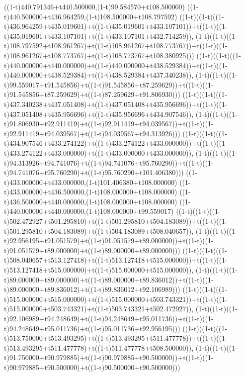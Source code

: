 ((1-t)440.791346+t440.500000,(1-t)99.584570+t108.500000)
((1-t)440.500000+t436.964259,(1-t)108.500000+t108.797592)
((1-t)((1-t)((1-t)436.964259+t435.019601)+t((1-t)435.019601+t433.107101))+t((1-t)((1-t)435.019601+t433.107101)+t((1-t)433.107101+t432.714259)),                                     (1-t)((1-t)((1-t)108.797592+t108.961267)+t((1-t)108.961267+t108.773767))+t((1-t)((1-t)108.961267+t108.773767)+t((1-t)108.773767+t108.380925)))
((1-t)((1-t)((1-t)440.000000+t440.000000)+t((1-t)440.000000+t438.529384))+t((1-t)((1-t)440.000000+t438.529384)+t((1-t)438.529384+t437.340238)),                                     (1-t)((1-t)((1-t)99.559017+t91.545856)+t((1-t)91.545856+t87.259629))+t((1-t)((1-t)91.545856+t87.259629)+t((1-t)87.259629+t91.806930)))
((1-t)((1-t)((1-t)437.340238+t437.051408)+t((1-t)437.051408+t435.956696))+t((1-t)((1-t)437.051408+t435.956696)+t((1-t)435.956696+t434.907546)),                                     (1-t)((1-t)((1-t)91.806930+t92.911419)+t((1-t)92.911419+t94.039567))+t((1-t)((1-t)92.911419+t94.039567)+t((1-t)94.039567+t94.313926)))
((1-t)((1-t)((1-t)434.907546+t433.274122)+t((1-t)433.274122+t433.000000))+t((1-t)((1-t)433.274122+t433.000000)+t((1-t)433.000000+t433.000000)),                                     (1-t)((1-t)((1-t)94.313926+t94.741076)+t((1-t)94.741076+t95.760290))+t((1-t)((1-t)94.741076+t95.760290)+t((1-t)95.760290+t101.406380)))
((1-t)433.000000+t433.000000,(1-t)101.406380+t108.000000)
((1-t)433.000000+t436.500000,(1-t)108.000000+t108.000000)
((1-t)436.500000+t440.000000,(1-t)108.000000+t108.000000)
((1-t)440.000000+t440.000000,(1-t)108.000000+t99.559017)
((1-t)((1-t)((1-t)502.472927+t501.295810)+t((1-t)501.295810+t504.183089))+t((1-t)((1-t)501.295810+t504.183089)+t((1-t)504.183089+t508.040657)),                                     (1-t)((1-t)((1-t)92.956195+t91.051579)+t((1-t)91.051579+t89.000000))+t((1-t)((1-t)91.051579+t89.000000)+t((1-t)89.000000+t89.000000)))
((1-t)((1-t)((1-t)508.040657+t513.127418)+t((1-t)513.127418+t515.000000))+t((1-t)((1-t)513.127418+t515.000000)+t((1-t)515.000000+t515.000000)),                                     (1-t)((1-t)((1-t)89.000000+t89.000000)+t((1-t)89.000000+t89.836012))+t((1-t)((1-t)89.000000+t89.836012)+t((1-t)89.836012+t92.106989)))
((1-t)((1-t)((1-t)515.000000+t515.000000)+t((1-t)515.000000+t503.743321))+t((1-t)((1-t)515.000000+t503.743321)+t((1-t)503.743321+t502.472927)),                                     (1-t)((1-t)((1-t)92.106989+t94.248649)+t((1-t)94.248649+t95.011736))+t((1-t)((1-t)94.248649+t95.011736)+t((1-t)95.011736+t92.956195)))
((1-t)((1-t)((1-t)513.750000+t513.493295)+t((1-t)513.493295+t511.477778))+t((1-t)((1-t)513.493295+t511.477778)+t((1-t)511.477778+t508.500000)),                                     (1-t)((1-t)((1-t)91.750000+t90.979885)+t((1-t)90.979885+t90.500000))+t((1-t)((1-t)90.979885+t90.500000)+t((1-t)90.500000+t90.500000)))
